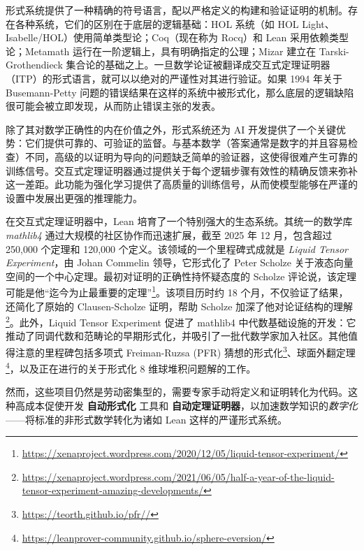 \documentclass[11pt]{article}
\numberwithin{equation}{section}
\begin{document}
形式系统提供了一种精确的符号语言，配以严格定义的构建和验证证明的机制。存在各种系统，它们的区别在于底层的逻辑基础：HOL 系统（如 HOL Light、Isabelle/HOL）使用简单类型论；Coq（现在称为 Rocq）和 Lean 采用依赖类型论；Metamath 运行在一阶逻辑上，具有明确指定的公理；Mizar 建立在 Tarski-Grothendieck 集合论的基础之上。一旦数学论证被翻译成交互式定理证明器（ITP）的形式语言，就可以以绝对的严谨性对其进行验证。如果 1994 年关于 Busemann-Petty 问题的错误结果在这样的系统中被形式化，那么底层的逻辑缺陷很可能会被立即发现，从而防止错误主张的发表。

除了其对数学正确性的内在价值之外，形式系统还为 AI 开发提供了一个关键优势：它们提供可靠的、可验证的监督。与基本数学（答案通常是数字的并且容易检查）不同，高级的以证明为导向的问题缺乏简单的验证器，这使得很难产生可靠的训练信号。交互式定理证明器通过提供关于每个逻辑步骤有效性的精确反馈来弥补这一差距。此功能为强化学习提供了高质量的训练信号，从而使模型能够在严谨的设置中发展出更强的推理能力。

在交互式定理证明器中，Lean \cite{DBLP:conf/cade/MouraKADR15,DBLP:conf/cade/Moura021} 培育了一个特别强大的生态系统。其统一的数学库 \textit{mathlib4} 通过大规模的社区协作而迅速扩展，截至 2025 年 12 月，包含超过 250,000 个定理和 120,000 个定义。该领域的一个里程碑式成就是 \textit{Liquid Tensor Experiment}，由 Johan Commelin 领导，它形式化了 Peter Scholze 关于液态向量空间的一个中心定理。最初对证明的正确性持怀疑态度的 Scholze 评论说，该定理可能是他“迄今为止最重要的定理”\footnote{\href{https://xenaproject.wordpress.com/2020/12/05/liquid-tensor-experiment/}{https://xenaproject.wordpress.com/2020/12/05/liquid-tensor-experiment/}}。该项目历时约 18 个月，不仅验证了结果，还简化了原始的 Clausen-Scholze 证明，帮助 Scholze 加深了他对论证结构的理解\footnote{\href{https://xenaproject.wordpress.com/2021/06/05/half-a-year-of-the-liquid-tensor-experiment-amazing-developments/}{https://xenaproject.wordpress.com/2021/06/05/half-a-year-of-the-liquid-tensor-experiment-amazing-developments/}}。此外，Liquid Tensor Experiment 促进了 mathlib4 中代数基础设施的开发：它推动了同调代数和范畴论的早期形式化，并吸引了一批代数学家加入社区。其他值得注意的里程碑包括多项式 Freiman-Ruzsa (PFR) 猜想的形式化\footnote{\href{https://teorth.github.io/pfr//}{https://teorth.github.io/pfr//}}、球面外翻定理\footnote{\href{https://leanprover-community.github.io/sphere-eversion/}{https://leanprover-community.github.io/sphere-eversion/}}，以及正在进行的关于形式化 8 维球堆积问题解的工作。

然而，这些项目仍然是劳动密集型的，需要专家手动将定义和证明转化为代码。这种高成本促使开发 \textbf{自动形式化} 工具和 \textbf{自动定理证明器}，以加速数学知识的\textit{数字化}——将标准的非形式数学转化为诸如 Lean 这样的严谨形式系统。
\end{document}
